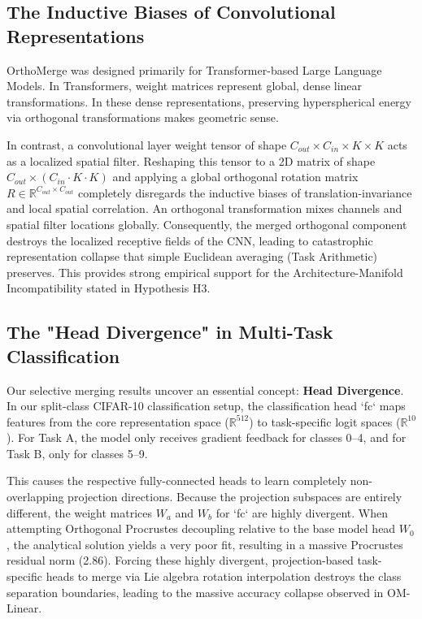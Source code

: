 \documentclass{article}
\begin{document}
\subsection{The Inductive Biases of Convolutional Representations}
OrthoMerge was designed primarily for Transformer-based Large Language Models. 
In Transformers, weight matrices represent global, dense linear transformations. 
In these dense representations, preserving hyperspherical energy via orthogonal transformations makes geometric sense.

In contrast, a convolutional layer weight tensor of shape $C_{out} \times C_{in} \times K \times K$ acts as a localized spatial filter. 
Reshaping this tensor to a 2D matrix of shape $C_{out} \times (C_{in} \cdot K \cdot K)$ and applying a global orthogonal rotation matrix $R \in \mathbb{R}^{C_{out} \times C_{out}}$ completely disregards the inductive biases of translation-invariance and local spatial correlation. 
An orthogonal transformation mixes channels and spatial filter locations globally. 
Consequently, the merged orthogonal component destroys the localized receptive fields of the CNN, leading to catastrophic representation collapse that simple Euclidean averaging (Task Arithmetic) preserves. 
This provides strong empirical support for the Architecture-Manifold Incompatibility stated in Hypothesis H3.

\subsection{The "Head Divergence" in Multi-Task Classification}
Our selective merging results uncover an essential concept: \textbf{Head Divergence}. 
In our split-class CIFAR-10 classification setup, the classification head `fc` maps features from the core representation space ($\mathbb{R}^{512}$) to task-specific logit spaces ($\mathbb{R}^{10}$). 
For Task A, the model only receives gradient feedback for classes 0--4, and for Task B, only for classes 5--9. 

This causes the respective fully-connected heads to learn completely non-overlapping projection directions. 
Because the projection subspaces are entirely different, the weight matrices $W_a$ and $W_b$ for `fc` are highly divergent. 
When attempting Orthogonal Procrustes decoupling relative to the base model head $W_0$, the analytical solution yields a very poor fit, resulting in a massive Procrustes residual norm (2.86). 
Forcing these highly divergent, projection-based task-specific heads to merge via Lie algebra rotation interpolation destroys the class separation boundaries, leading to the massive accuracy collapse observed in OM-Linear.
\end{document}
